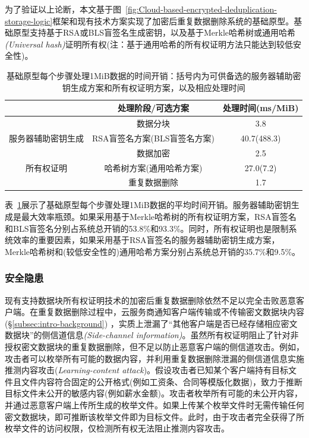 为了验证以上论断，本文基于图~\ref{fig:Cloud-based-encrypted-deduplication-storage-logic}框架和现有技术方案实现了加密后重复数据删除系统的基础原型。基础原型支持基于RSA或BLS盲签名生成密钥，以及基于Merkle哈希树或通用哈希\textit{(Universal hash)}证明所有权(注：基于通用哈希的所有权证明方法只能达到较低安全性)。

\begin{table}[!htb]
  \small
  \centering
  \begin{tabular}{@{}ccc@{}}
    \toprule
                                & 处理阶段/可选方案            & 处理时间(ms/MiB) \\ \midrule
                                & 数据分块                     & 3.8              \\
    服务器辅助密钥生成          & RSA盲签名方案(BLS盲签名方案) & 40.7(488.3)      \\
    \multirow{3}{*}{所有权证明} & 数据加密                     & 2.5              \\
                                & 哈希树方案(通用哈希方案)     & 27.0(7.2)        \\
                                & 重复数据删除                 & 1.7              \\ \bottomrule
  \end{tabular}
  \caption{基础原型每个步骤处理1MiB数据的时间开销：括号内为可供备选的服务器辅助密钥生成方案和所有权证明方案，以及相应处理时间}
  \label{tab:intro-bottleneck}
\end{table}

表~\ref{tab:intro-bottleneck}展示了基础原型每个步骤处理1MiB数据的平均时间开销。服务器辅助密钥生成是最大效率瓶颈。如果采用基于Merkle哈希树的所有权证明方案，RSA盲签名和BLS盲签名分别占系统总开销的53.8\%和93.3\%。同时，所有权证明也是限制系统效率的重要因素，如果采用基于RSA盲签名的服务器辅助密钥生成方案，Merkle哈希树和(较低安全性的)通用哈希方案分别占系统总开销的35.7\%和9.5\%。

\subsubsection{安全隐患}
\label{subsubsec:intro-problem-security}

现有支持数据块所有权证明技术的加密后重复数据删除依然不足以完全击败恶意客户端。在重复数据删除过程中，云服务商通知客户端传输或不传输密文数据块内容(\S\ref{subsec:intro-background}) ，实质上泄漏了“其他客户端是否已经存储相应密文数据块”的侧信道信息\textit{(Side-channel information)}。虽然所有权证明阻止了针对非授权密文数据块的重复数据删除，但不足以防止恶意客户端的侧信道攻击。例如，攻击者可以枚举所有可能的数据内容，并利用重复数据删除泄漏的侧信道信息实施推测内容攻击(\textit{Learning-content attack})。假设攻击者已知某个客户端持有目标文件且文件内容符合固定的公开格式(例如工资条、合同等模版化数据)，致力于推断目标文件未公开的敏感内容(例如薪水金额)。攻击者枚举所有可能的未公开内容，并通过恶意客户端上传所生成的枚举文件。如果上传某个枚举文件时无需传输任何密文数据块，即可推断该枚举文件即为目标文件。此时，由于攻击者完全获得了所枚举文件的访问权限，仅检测所有权无法阻止推测内容攻击。

